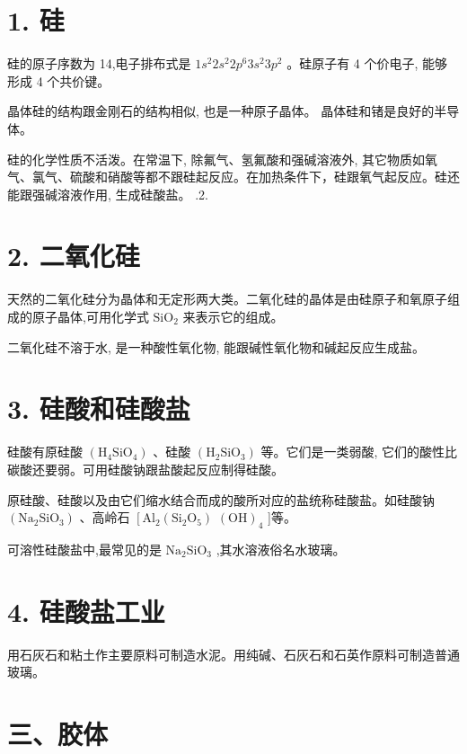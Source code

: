 \documentclass[10pt]{article}
\begin{document}
\section*{1. 硅}

硅的原子序数为 14,电子排布式是 \(1{s}^{2}2{s}^{2}2{p}^{6}3{s}^{2}3{p}^{2}\) 。硅原子有 4 个价电子, 能够形成 4 个共价键。

晶体硅的结构跟金刚石的结构相似, 也是一种原子晶体。 晶体硅和锗是良好的半导体。

硅的化学性质不活泼。在常温下, 除氟气、氢氟酸和强碱溶液外, 其它物质如氧气、氯气、硫酸和硝酸等都不跟硅起反应。在加热条件下，硅跟氧气起反应。硅还能跟强碱溶液作用, 生成硅酸盐。 .2.

\section*{2. 二氧化硅}

天然的二氧化硅分为晶体和无定形两大类。二氧化硅的晶体是由硅原子和氧原子组成的原子晶体,可用化学式 \({\mathrm{{SiO}}}_{2}\) 来表示它的组成。

二氧化硅不溶于水, 是一种酸性氧化物, 能跟碱性氧化物和碱起反应生成盐。

\section*{3. 硅酸和硅酸盐}

硅酸有原硅酸 \(\left( {{\mathrm{H}}_{4}{\mathrm{{SiO}}}_{4}}\right)\) 、硅酸 \(\left( {{\mathrm{H}}_{2}{\mathrm{{SiO}}}_{3}}\right)\) 等。它们是一类弱酸, 它们的酸性比碳酸还要弱。可用硅酸钠跟盐酸起反应制得硅酸。

原硅酸、硅酸以及由它们缩水结合而成的酸所对应的盐统称硅酸盐。如硅酸钠 \(\left( {{\mathrm{{Na}}}_{2}{\mathrm{{SiO}}}_{3}}\right)\) 、高岭石 \(\left\lbrack {{\mathrm{{Al}}}_{2}\left( {{\mathrm{{Si}}}_{2}{\mathrm{O}}_{5}}\right) }\right.\) \({\left( \mathrm{{OH}}\right) }_{4}\) ]等。

可溶性硅酸盐中,最常见的是 \({\mathrm{{Na}}}_{2}{\mathrm{{SiO}}}_{3}\) ,其水溶液俗名水玻璃。

\section*{4. 硅酸盐工业}

用石灰石和粘土作主要原料可制造水泥。用纯碱、石灰石和石英作原料可制造普通玻璃。

\section*{三、胶体}
\end{document}
